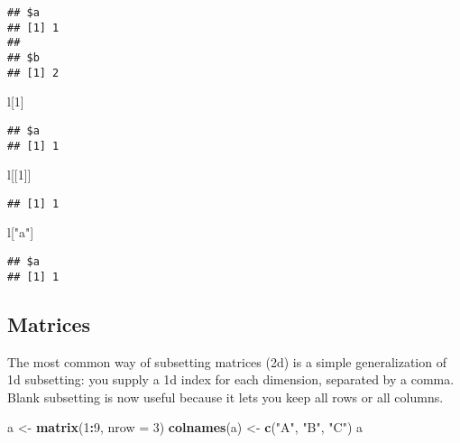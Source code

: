 \documentclass[
]{book}
\newenvironment{Shaded}{\begin{snugshade}}{\end{snugshade}}
\newcommand{\DataTypeTok}[1]{\textcolor[rgb]{0.13,0.29,0.53}{#1}}
\newcommand{\DecValTok}[1]{\textcolor[rgb]{0.00,0.00,0.81}{#1}}
\newcommand{\KeywordTok}[1]{\textcolor[rgb]{0.13,0.29,0.53}{\textbf{#1}}}
\newcommand{\NormalTok}[1]{#1}
\newcommand{\OperatorTok}[1]{\textcolor[rgb]{0.81,0.36,0.00}{\textbf{#1}}}
\newcommand{\StringTok}[1]{\textcolor[rgb]{0.31,0.60,0.02}{#1}}
\begin{document}
\begin{verbatim}
## $a
## [1] 1
## 
## $b
## [1] 2
\end{verbatim}

\begin{Shaded}
\begin{Highlighting}[]
\NormalTok{l[}\DecValTok{1}\NormalTok{]}
\end{Highlighting}
\end{Shaded}

\begin{verbatim}
## $a
## [1] 1
\end{verbatim}

\begin{Shaded}
\begin{Highlighting}[]
\NormalTok{l[[}\DecValTok{1}\NormalTok{]]}
\end{Highlighting}
\end{Shaded}

\begin{verbatim}
## [1] 1
\end{verbatim}

\begin{Shaded}
\begin{Highlighting}[]
\NormalTok{l[}\StringTok{"a"}\NormalTok{]}
\end{Highlighting}
\end{Shaded}

\begin{verbatim}
## $a
## [1] 1
\end{verbatim}

\hypertarget{matrices-1}{%
\subsection{Matrices}\label{matrices-1}}

The most common way of subsetting matrices (2d) is a simple generalization of 1d subsetting: you supply a 1d index for each dimension, separated by a comma. Blank subsetting is now useful because it lets you keep all rows or all columns.

\begin{Shaded}
\begin{Highlighting}[]
\NormalTok{a \textless{}{-}}\StringTok{ }\KeywordTok{matrix}\NormalTok{(}\DecValTok{1}\OperatorTok{:}\DecValTok{9}\NormalTok{, }\DataTypeTok{nrow =} \DecValTok{3}\NormalTok{)}
\KeywordTok{colnames}\NormalTok{(a) \textless{}{-}}\StringTok{ }\KeywordTok{c}\NormalTok{(}\StringTok{"A"}\NormalTok{, }\StringTok{"B"}\NormalTok{, }\StringTok{"C"}\NormalTok{)}
\NormalTok{a}
\end{Highlighting}
\end{Shaded}
\end{document}
